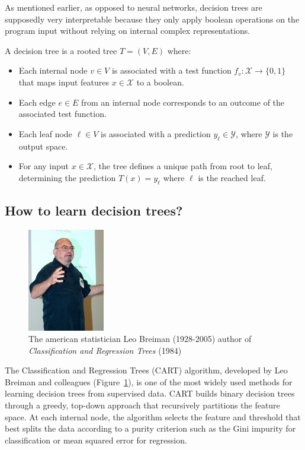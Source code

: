 As mentioned earlier, as opposed to neural networks, decision trees are supposedly very interpretable because they only apply boolean operations on the program input without relying on internal complex representations.
\begin{definition}
A decision tree is a rooted tree $T = (V, E)$ where:
\begin{itemize}
\item Each internal node $v \in V$ is associated with a test function $f_v: \mathcal{X} \rightarrow \{0, 1\}$ that maps input features $x \in \mathcal{X}$ to a boolean.
\item Each edge $e \in E$ from an internal node corresponds to an outcome of the associated test function.
\item Each leaf node $\ell \in V$ is associated with a prediction $y_\ell \in \mathcal{Y}$, where $\mathcal{Y}$ is the output space.
\item For any input $x \in \mathcal{X}$, the tree defines a unique path from root to leaf, determining the prediction $T(x) = y_\ell$ where $\ell$ is the reached leaf.
\end{itemize}
\end{definition}
\subsection{How to learn decision trees?}
\begin{figure}
    \centering
    \includegraphics[width=0.3\textwidth]{images/images_intro/Leo_Breiman.jpg}
    \caption{The american statistician Leo Breiman (1928-2005) author of \textit{Classification and Regression Trees} (1984)}
    \label{fig:leo-breiman}
\end{figure}

The Classification and Regression Trees (CART) algorithm, developed by Leo Breiman and colleagues (Figure~\ref{fig:leo-breiman}), is one of the most widely used methods for learning decision trees from supervised data. CART builds binary decision trees through a greedy, top-down approach that recursively partitions the feature space. At each internal node, the algorithm selects the feature and threshold that best splits the data according to a purity criterion such as the Gini impurity for classification or mean squared error for regression.

